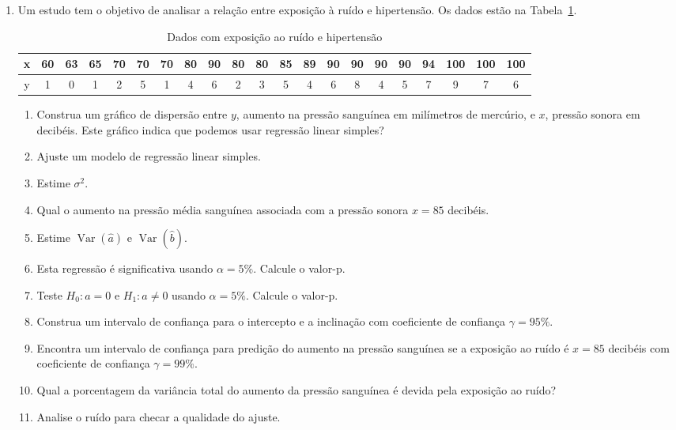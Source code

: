 \documentclass[12pt, a4paper]{article}
\DeclareMathOperator {\vari}{Var}
\begin{document}
\begin{enumerate}
	\item Um estudo tem o objetivo de analisar a relação entre exposição à ruído e hipertensão. Os dados estão na Tabela~\ref{tab:ruido-hipertensao}.
	\begin{table}[ht]
		\centering
		\begin{tabular}{c|cccccccccccccccccccc}
			\toprule[0.05cm]
			x & 60 & 63 & 65 & 70 & 70 & 70 & 80 & 90 & 80 & 80 & 85 & 89 & 90 & 90 & 90 & 90 & 94 & 100 & 100 & 100 \\ \midrule[0.025cm]
			y & 1 & 0 & 1 & 2 & 5 & 1 & 4 & 6 & 2 & 3 & 5 & 4 & 6 & 8 & 4 & 5 & 7 & 9 & 7 & 6 \\ 
			\bottomrule[0.05cm]
		\end{tabular}
		\caption{Dados com exposição ao ruído e hipertensão} 
		\label{tab:ruido-hipertensao}
	\end{table}
	\begin{enumerate}
		\item Construa um gráfico de dispersão entre $y$, aumento na pressão sanguínea em milímetros de mercúrio, e $x$, pressão sonora em decibéis. Este gráfico indica que podemos usar regressão linear simples?
		\item Ajuste um modelo de regressão linear simples.
		\item Estime $\sigma^2$.
		\item Qual o aumento na pressão média sanguínea associada com a pressão sonora $x=85$ decibéis.
		\item Estime $\vari(\hat{a})$ e $\vari(\hat{b})$.
		\item Esta regressão é significativa usando $\alpha=5\%$. Calcule o valor-p.
		\item Teste $H_0: a = 0$ e $H_1: a \neq 0$ usando $\alpha = 5\%$. Calcule o valor-p.
		\item Construa um intervalo de confiança para o intercepto e a inclinação com coeficiente de confiança $\gamma=95\%$.
		\item Encontra um intervalo de confiança para predição do aumento na pressão sanguínea se a exposição ao ruído é $x=85$ decibéis com coeficiente de confiança $\gamma=99\%$.
		\item Qual a porcentagem da variância total do aumento da pressão sanguínea é devida pela exposição ao ruído?
		\item Analise o ruído para checar a qualidade do ajuste.
	\end{enumerate}


\end{enumerate}
\end{document}
